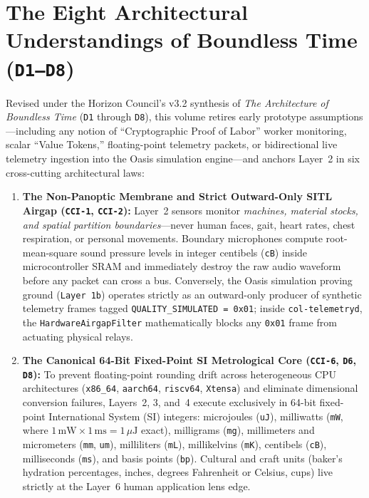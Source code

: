 \section*{The Eight Architectural Understandings of Boundless Time (\texttt{D1--D8})}

Revised under the Horizon Council's v3.2 synthesis of \textit{The Architecture of Boundless Time} (\texttt{D1} through \texttt{D8}), this volume retires early prototype assumptions---including any notion of ``Cryptographic Proof of Labor'' worker monitoring, scalar ``Value Tokens,'' floating-point telemetry packets, or bidirectional live telemetry ingestion into the Oasis simulation engine---and anchors Layer~2 in six cross-cutting architectural laws:

\begin{enumerate}
    \item \textbf{The Non-Panoptic Membrane and Strict Outward-Only SITL Airgap (\texttt{CCI-1}, \texttt{CCI-2}):} Layer~2 sensors monitor \textit{machines, material stocks, and spatial partition boundaries}---never human faces, gait, heart rates, chest respiration, or personal movements. Boundary microphones compute root-mean-square sound pressure levels in integer centibels (\texttt{cB}) inside microcontroller SRAM and immediately destroy the raw audio waveform before any packet can cross a bus. Conversely, the Oasis simulation proving ground (\texttt{Layer 1b}) operates strictly as an outward-only producer of synthetic telemetry frames tagged \texttt{QUALITY\_SIMULATED = 0x01}; inside \texttt{col-telemetryd}, the \texttt{HardwareAirgapFilter} mathematically blocks any \texttt{0x01} frame from actuating physical relays.
    \item \textbf{The Canonical 64-Bit Fixed-Point SI Metrological Core (\texttt{CCI-6}, \texttt{D6}, \texttt{D8}):} To prevent floating-point rounding drift across heterogeneous CPU architectures (\texttt{x86\_64}, \texttt{aarch64}, \texttt{riscv64}, \texttt{Xtensa}) and eliminate dimensional conversion failures, Layers~2, 3, and~4 execute exclusively in 64-bit fixed-point International System (SI) integers: microjoules (\texttt{uJ}), milliwatts (\texttt{mW}, where $1\,\mathrm{mW} \times 1\,\mathrm{ms} = 1\,\mu\mathrm{J}$ exact), milligrams (\texttt{mg}), millimeters and micrometers (\texttt{mm}, \texttt{um}), milliliters (\texttt{mL}), millikelvins (\texttt{mK}), centibels (\texttt{cB}), milliseconds (\texttt{ms}), and basis points (\texttt{bp}). Cultural and craft units (baker's hydration percentages, inches, degrees Fahrenheit or Celsius, cups) live strictly at the Layer~6 human application lens edge.

\end{enumerate}

